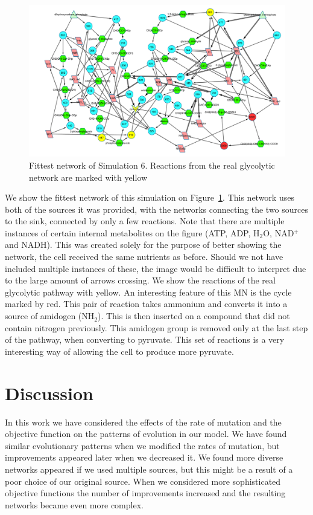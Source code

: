 \documentclass[a4paper,12pt]{article}
\begin{document}
\begin{figure}[htpb]
	\centering
	\includegraphics[width=1\linewidth]{sim6network.pdf}
	\caption{Fittest network of Simulation 6. Reactions from the real glycolytic network are marked with yellow}
	\label{fig:sim6network}
\end{figure}

We show the fittest network of this simulation on Figure~\ref{fig:sim6network}. This network uses both of the sources it was provided, with the networks connecting the two sources to the sink, connected by only a few reactions. Note that there are multiple instances of certain internal metabolites on the figure (ATP, ADP, H$_2$O, NAD$^+$ and NADH). This was created solely for the purpose of better showing the network, the cell received the same nutrients as before. Should we not have included multiple instances of these, the image would be difficult to interpret due to the large amount of arrows crossing. We show the reactions of the real glycolytic pathway with yellow. An interesting feature of this MN is the cycle marked by red. This pair of reaction takes ammonium and converts it into a source of amidogen (NH$_2$). This is then inserted on a compound that did not contain nitrogen previously. This amidogen group is removed only at the last step of the pathway, when converting to pyruvate. This set of reactions is a very interesting way of allowing the cell to produce more pyruvate. 


\section{Discussion}
\label{sec:discussion}

In this work we have considered the effects of the rate of mutation and the objective function on the patterns of evolution in our model. We have found similar evolutionary patterns when we modified the rates of mutation, but improvements appeared later when we decreased it. We found more diverse networks appeared if we used multiple sources, but this might be a result of a poor choice of our original source. When we considered more sophisticated objective functions the number of improvements increased and the resulting networks became even more complex. 
\end{document}

